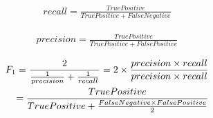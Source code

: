 \begin{eqnarray}
recall = \frac{True Positive}{ True Positive + False Negative}\label{eqn:recall}
\end{eqnarray}

\begin{eqnarray}
precision = \frac{ True Positive}{ True Positive + False Positive}\label{eqn:precision}
\end{eqnarray} 

\begin{eqnarray}  F_1 = \frac{2}{\frac{1}{precision} + \frac{1}{ recall}} = 2 \times \frac{ precision \times  recall}{ precision \times recall} \\
\notag  = \frac{ True Positive}{ True Positive + \frac{ False Negative \times  False Positive}{2}}\label{eqn:f1}
\end{eqnarray}

